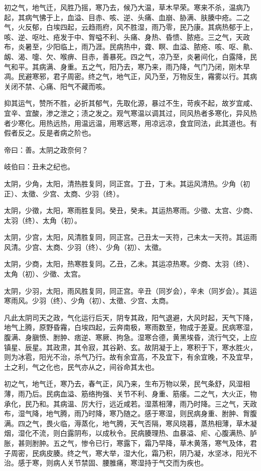 \documentclass{article}%
\begin{document}
初之气，地气迁，风胜乃摇，寒乃去，候乃大温，草木早荣。寒来不杀，温病乃起，其病气怫于上，血溢、目赤、咳、逆、头痛、血崩、胁满、肤腠中疮。二之气，火反郁，白埃四起，云趋雨府，风不胜湿，雨乃零，民乃康。其病热郁于上，咳、逆、呕吐、疮发于中、胷嗌不利、头痛、身热、昏愦、脓疮。三之气，天政布，炎暑至，少阳临上，雨乃涯。民病热中，聋、瞑、血溢、脓疮、咳、呕、鼽、衂、渴、嚏、欠、喉痹、目赤，善暴死。四之气，凉乃至，炎暑间化，白露降，民气和平。其病满、身重。五之气，阳乃去，寒乃来，雨乃降，气门乃闭，刚木早凋。民避寒邪，君子周密。终之气，地气正，风乃至，万物反生，霿雾以行。其病关闭不禁、心痛、阳气不藏而咳。

抑其运气，赞所不胜，必折其郁气，先取化源，暴过不生，苛疾不起，故岁宜咸、宜辛、宜酸，渗之泄之；渍之发之。观气寒温以调其过，同风热者多寒化，异风热者少寒化。用热远热，用温远温，用寒远寒，用凉远凉，食宜同法，此其道也。有假者反之。反是者病之阶也。

帝曰：善。太阴之政奈何？

岐伯曰：丑未之纪也。

太阴，少角，太阳，清热胜复同，同正宫。丁丑，丁未。其运风清热。少角（初正）、太徵、少宫、太商、少羽（终）。

太阴，少徵，太阳，寒雨胜复同。癸丑，癸未。其运热寒雨。少徵、太宫、少商、太羽（终）、太角（初）。

太阴，少宫，太阳，风清胜复同，同正宫。己丑太一天符，己未太一天符。其运雨风清。少宫、太商、少羽（终）、少角（初）、太徵。

太阴，少商，太阳，热寒胜复同。乙丑，乙未。其运凉热寒。少商、太羽（终）、太角（初）、少徵、太宫。

太阴，少羽，太阳，雨风胜复同，同正宫。辛丑（同岁会），辛未（同岁会）。其运寒雨风。少羽（终）、少角（初）、太徵、少宫、太商。

凡此太阴司天之政，气化运行后天，阴专其政，阳气退避，大风时起，天气下降，地气上腾，原野昏霿，白埃四起，云奔南极，寒雨数至，物成于差夏。民病寒湿，腹满、身䐜愤、胕肿、痞逆、寒厥、拘急。湿寒合德，黄黑埃昏，流行气交，上应镇星、辰星。其政肃，其令寂，其谷黅、玄。故阴凝于上，寒积于下，寒水胜火，则为冰雹，阳光不治，杀气乃行。故有余宜高，不及宜下，有余宜晚，不及宜早，土之利，气之化也，民气亦从之，间谷命其太也。

初之气，地气迁，寒乃去，春气正，风乃来，生布万物以荣，民气条舒，风湿相薄，雨乃后。民病血溢、筋络拘强、关节不利、身重、筋痿。二之气，大火正，物承化，民乃和。其病温、厉大行，远近咸若。湿蒸相薄，雨乃时降。三之气，天政布，湿气降，地气腾，雨乃时降，寒乃随之。感于寒湿，则民病身重、胕肿、胷腹满。四之气，畏火临，溽蒸化，地气腾，天气否隔，寒风晓暮，蒸热相薄，草木凝烟，湿化不流，则白露阴布，以成秋令。民病腠理热、血暴溢、疟、心腹满热、胪胀，甚则胕肿。五之气，惨令已行，寒露下，霜乃早降，草木黄落，寒气及体，君子周密，民病皮腠。终之气，寒大举，湿大化，霜乃积，阴乃凝，水坚冰，阳光不治。感于寒，则病人关节禁固、腰脽痛，寒湿持于气交而为疾也。
\end{document}
